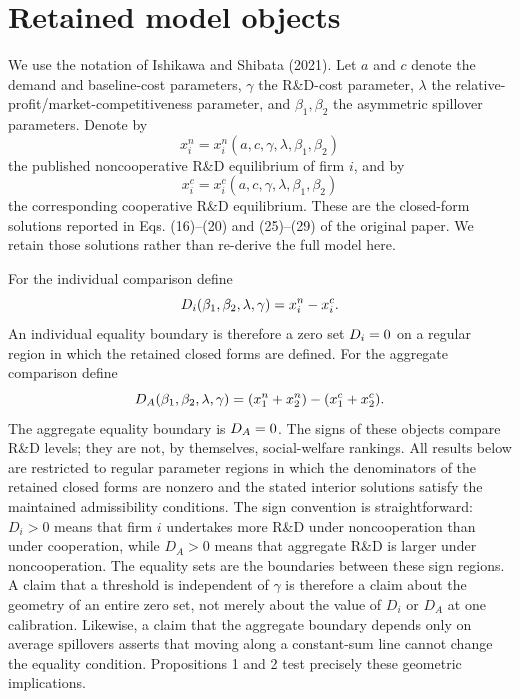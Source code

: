 \section{Retained model objects}

We use the notation of Ishikawa and Shibata (2021). Let $a$ and $c$ denote the demand and baseline-cost parameters, $\gamma$ the R\&D-cost parameter, $\lambda$ the relative-profit/market-competitiveness parameter, and $\beta_1,\beta_2$ the asymmetric spillover parameters. Denote by
\[
 x_i^n=x_i^n(a,c,\gamma,\lambda,\beta_1,\beta_2)
\]
the published noncooperative R\&D equilibrium of firm $i$, and by
\[
 x_i^c=x_i^c(a,c,\gamma,\lambda,\beta_1,\beta_2)
\]
the corresponding cooperative R\&D equilibrium. These are the closed-form solutions reported in Eqs. (16)--(20) and (25)--(29) of the original paper. We retain those solutions rather than re-derive the full model here.

For the individual comparison define
\begin{equation}\label{eq:Di}
 D_i(\beta_1,\beta_2,\lambda,\gamma)=x_i^n-x_i^c.
\end{equation}
An individual equality boundary is therefore a zero set $D_i=0$ on a regular region in which the retained closed forms are defined. For the aggregate comparison define
\begin{equation}\label{eq:DA}
 D_A(\beta_1,\beta_2,\lambda,\gamma)
 =(x_1^n+x_2^n)-(x_1^c+x_2^c).
\end{equation}
The aggregate equality boundary is $D_A=0$. The signs of these objects compare R\&D levels; they are not, by themselves, social-welfare rankings. All results below are restricted to regular parameter regions in which the denominators of the retained closed forms are nonzero and the stated interior solutions satisfy the maintained admissibility conditions. The sign convention is straightforward: $D_i>0$ means that firm $i$ undertakes more R\&D under noncooperation than under cooperation, while $D_A>0$ means that aggregate R\&D is larger under noncooperation. The equality sets are the boundaries between these sign regions. A claim that a threshold is independent of $\gamma$ is therefore a claim about the geometry of an entire zero set, not merely about the value of $D_i$ or $D_A$ at one calibration. Likewise, a claim that the aggregate boundary depends only on average spillovers asserts that moving along a constant-sum line cannot change the equality condition. Propositions 1 and 2 test precisely these geometric implications.

